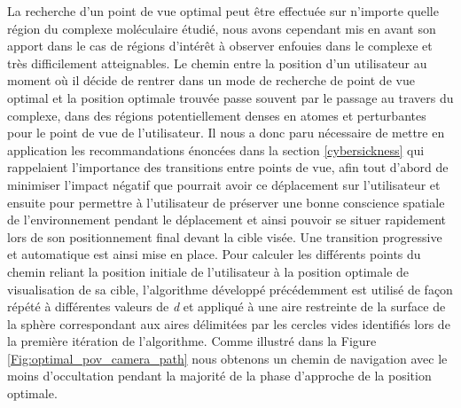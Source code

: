 La recherche d'un point de vue optimal peut être effectuée sur n'importe quelle région du complexe moléculaire étudié, nous avons cependant mis en avant son apport dans le cas de régions d'intérêt à observer enfouies dans le complexe et très difficilement atteignables. Le chemin entre la position d'un utilisateur au moment où il décide de rentrer dans un mode de recherche de point de vue optimal et la position optimale trouvée passe souvent par le passage au travers du complexe, dans des régions potentiellement denses en atomes et perturbantes pour le point de vue de l'utilisateur. Il nous a donc paru nécessaire de mettre en application les recommandations énoncées dans la section \ref{cybersickness} qui rappelaient l'importance des transitions entre points de vue, afin tout d'abord de minimiser l'impact négatif que pourrait avoir ce déplacement sur l'utilisateur et ensuite pour permettre à l'utilisateur de préserver une bonne conscience spatiale de l'environnement pendant le déplacement et ainsi pouvoir se situer rapidement lors de son positionnement final devant la cible visée.
Une transition progressive et automatique est ainsi mise en place. Pour calculer les différents points du chemin reliant la position initiale de l'utilisateur à la position optimale de visualisation de sa cible, l'algorithme développé précédemment est utilisé de façon répété à différentes valeurs de \textit{d} et appliqué à une aire restreinte de la surface de la sphère correspondant aux aires délimitées par les cercles vides identifiés lors de la première itération de l'algorithme. Comme illustré dans la Figure \ref{Fig:optimal_pov_camera_path} nous obtenons un chemin de navigation avec le moins d'occultation pendant la majorité de la phase d'approche de la position optimale.

